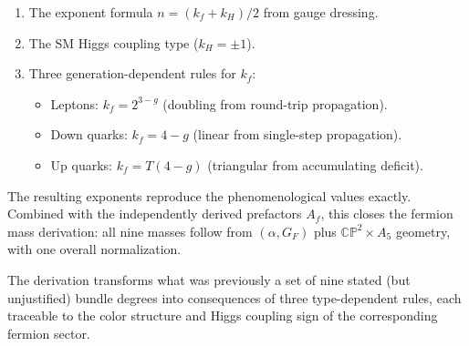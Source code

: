 \documentclass[11pt,a4paper]{article}
\newcommand{\CP}{\mathbb{CP}}
\theoremstyle{definition}
\theoremstyle{remark}
\begin{document}
\begin{enumerate}
\item The exponent formula $n = (k_f + k_H)/2$ from gauge dressing.
\item The SM Higgs coupling type ($k_H = \pm 1$).
\item Three generation-dependent rules for $k_f$:
  \begin{itemize}
  \item Leptons: $k_f = 2^{3-g}$ (doubling from round-trip propagation).
  \item Down quarks: $k_f = 4-g$ (linear from single-step propagation).
  \item Up quarks: $k_f = T(4-g)$ (triangular from accumulating deficit).
  \end{itemize}
\end{enumerate}

The resulting exponents reproduce the phenomenological values exactly.
Combined with the independently derived prefactors $A_f$, this closes
the fermion mass derivation: all nine masses follow from
$(\alpha, G_F)$ plus $\CP^2 \times A_5$ geometry, with one overall
normalization.

The derivation transforms what was previously a set of nine stated
(but unjustified) bundle degrees into consequences of three type-dependent
rules, each traceable to the color structure and Higgs coupling sign
of the corresponding fermion sector.
\end{document}
